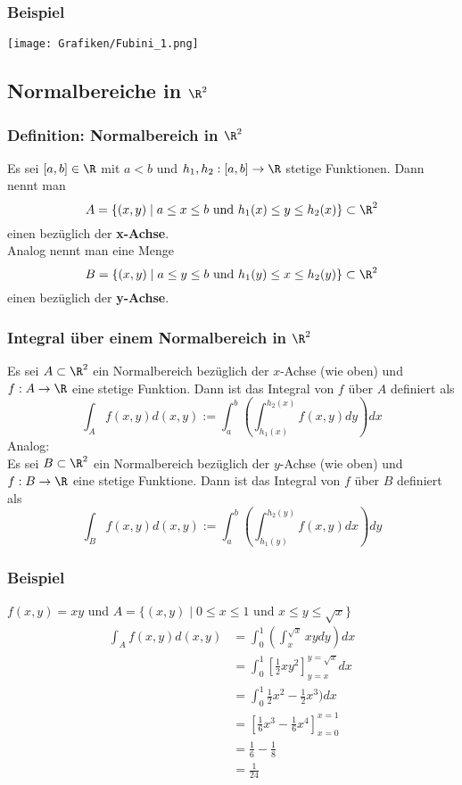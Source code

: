 %
\begin{frame}\frametitle{Beispiel}
		\begin{center}
			\texttt{[image: Grafiken/Fubini\_1.png]}
		\end{center}
	
	
\end{frame}
%
\subsection{Normalbereiche in $\R^2$}
%
\begin{frame}\frametitle{Definition: Normalbereich in $\R^2$}
Es sei $[a,b] \in \R$ mit $a<b$ und $h_1,h_2: [a,b] \to \R$ stetige Funktionen. Dann nennt man 
$$
A=\{(x,y) \mid a\le x\le b \text{ und } h_1(x) \le y \le h_2(x)\} \subset \R^2
$$
einen  bezüglich der \textbf{x-Achse}.\\\pause \vfill
Analog nennt man eine Menge 
$$
B=\{(x,y) \mid a\le y\le b \text{ und } h_1(y) \le x \le h_2(y)\}\subset \R^2
$$
einen  bezüglich der \textbf{y-Achse}.	
	
\end{frame}
%
%
\begin{frame}\frametitle{Integral über einem Normalbereich in $\R^2$}
Es sei $A \subset \R^2$ ein Normalbereich bezüglich der $x$-Achse (wie oben) und $f:A \to \R$ eine stetige Funktion. Dann ist das Integral von $f$ über $A$ definiert als
$$
\int_A f(x,y)d(x,y):= \int_a^b \left(\int_{h_1(x)}^{h_2(x)} f(x,y) dy \right)dx
$$
\pause \vfill
Analog:\\
Es sei $B \subset \R^2$ ein Normalbereich bezüglich der $y$-Achse (wie oben) und $f:B \to \R$ eine stetige Funktione. Dann ist das Integral von $f$ über $B$ definiert als
$$
\int_B f(x,y)d(x,y):= \int_a^b \left(\int_{h_1(y)}^{h_2(y)} f(x,y) dx \right)dy
$$
	
\end{frame}
%
\begin{frame}\frametitle{Beispiel}
$f(x,y)=xy$ und $A=\{(x,y) \mid 0\le x \le 1 \text{ und } x \le y \le \sqrt{x} \}$ \pause
\begin{align*}
\int_A f(x,y) d(x,y) &= \int_0^1 \left(\int_x^{\sqrt{x}} xy dy\right)dx\\
&=\int_0^1 \left[\frac{1}{2}xy^2\right]_{y=x}^{y=\sqrt{x}} dx\\
&=\int_0^1 \frac{1}{2}x^2-\frac{1}{2}x^3)dx\\
&=\left[ \frac{1}{6}x^3 -  \frac{1}{6}x^4\right]_{x=0}^{x=1}\\
&= \frac{1}{6}- \frac{1}{8}\\
&= \frac{1}{24}
\end{align*}
		
\end{frame}
%
